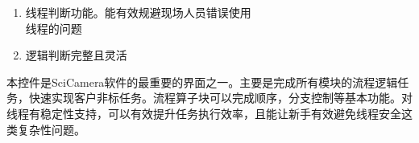 \documentclass[lighthipster]{simplehipstercv}
\begin{document}
\begin{minipage}[t]{\textwidth}
\begin{minipage}[t]{0.5\textwidth}
\begin{flushleft}
				\begin{enumerate}
					\item 线程判断功能。能有效规避现场人员错误使用\\线程的问题
					\item 逻辑判断完整且灵活
				\end{enumerate}
				\vspace{0.8em}
				本控件是SciCamera软件的最重要的界面之一。主要是完成所有模块的流程逻辑任务，快速实现客户非标任务。流程算子块可以完成顺序，分支控制等基本功能。对线程有稳定性支持，可以有效提升任务执行效率，且能让新手有效避免线程安全这类复杂性问题。
			\end{flushleft}
		\end{minipage}
		
		\vfill
		\vspace{2em}
		

\end{minipage}
\end{document}
